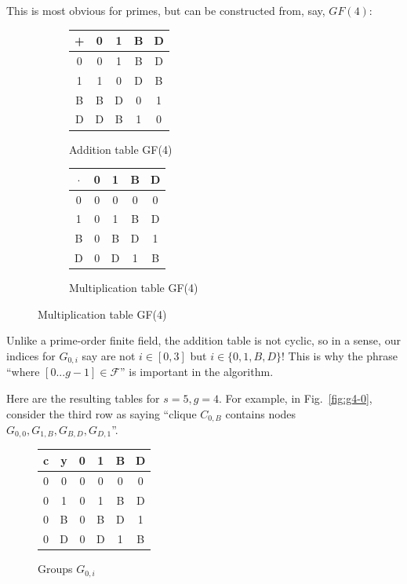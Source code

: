 \documentclass[11pt, oneside]{article} 	%
\begin{document}
This is most obvious for primes, but can be constructed from, say, $GF(4):$

\begin{figure}[!htb]
\centering
\begin{subfigure}{.3\textwidth}
 \centering
 \begin{tabular}{c | c c c c}
  + & 0 & 1 & B & D \\
\hline
  0 & 0 & 1 & B & D \\
  1 & 1 & 0 & D & B \\
  B & B & D & 0 & 1 \\
  D & D & B & 1 & 0 \\
  \end{tabular}
 \caption{Addition table GF(4)}
\label{fig:gf-add}
\end{subfigure}
\begin{subfigure}{.3\textwidth}
 \centering
\begin{tabular}{c | c c c c}
  $\cdot$ & 0 & 1 & B & D \\
\hline
  0 & 0 & 0 & 0 & 0 \\
  1 & 0 & 1 & B & D \\
  B & 0 & B & D & 1 \\
  D & 0 & D & 1 & B \\
\end{tabular}
 \caption{Multiplication table GF(4)}
\label{fig:gf-mult}
\end{subfigure}
\end{figure}

Unlike a prime-order finite field, the addition table is not cyclic, so in a sense, our indices for $G_{0,i}$ say are not $i \in [0, 3]$ but $i \in \{0,1,B,D\}$! This is why the phrase ``where $[0...g-1] \in \mathcal{F}$'' is important in the algorithm.

Here are the resulting tables for $s=5, g=4$. For example, in Fig.~\ref{fig:g4-0}, consider the third row as saying ``clique $C_{0,B}$ contains nodes $G_{0,0}, G_{1,B}, G_{B,D}, G_{D,1}$''.

\begin{figure}[!htb]
\centering
 \begin{tabular}{c c | c c c c}
  c & y & 0 & 1 & B & D \\
\hline
  0 & 0 & 0 & 0 & 0 & 0 \\
  0 & 1 & 0 & 1 & B & D \\
  0 & B & 0 & B & D & 1 \\
  0 & D & 0 & D & 1 & B \\
  \end{tabular}
\caption{Groups $G_{0,i}$}
\label{fig:gf4-0}
\end{figure}
\end{document}
